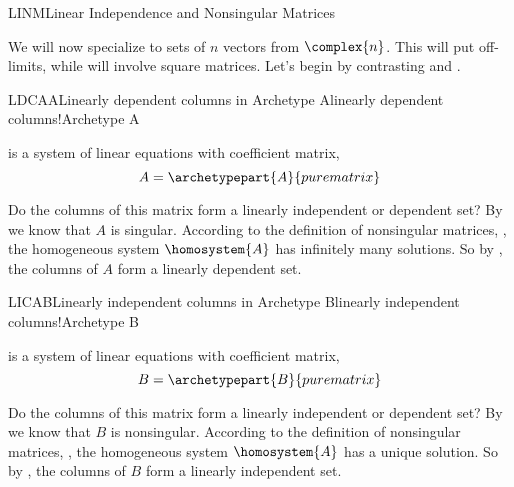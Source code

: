 \begin{subsect}{LINM}{Linear Independence and Nonsingular Matrices}
%
\begin{para}We will now specialize to sets of $n$ vectors from $\complex{n}$.  This will put  off-limits, while  will involve square matrices.  Let's begin by contrasting  and .
\end{para}
%
\begin{example}{LDCAA}{Linearly dependent columns in Archetype A}{linearly dependent columns!Archetype A}
\begin{para} is a system of linear equations with coefficient matrix,
%
\begin{equation*}
A=
\archetypepart{A}{purematrix}\end{equation*}
\end{para}
%
\begin{para}Do the columns of this matrix form a linearly independent or dependent set?  By  we know that $A$ is singular.  According to the definition of nonsingular matrices, , the homogeneous system $\homosystem{A}$ has infinitely many solutions.  So by , the columns of $A$ form a linearly dependent set.
\end{para}
%
\end{example}
%
\begin{example}{LICAB}{Linearly independent columns in Archetype B}{linearly independent columns!Archetype B}
\begin{para} is a system of linear equations with coefficient matrix,
%
\begin{equation*}
B=
\archetypepart{B}{purematrix}\end{equation*}
\end{para}
%
\begin{para}Do the columns of this matrix form a linearly independent or dependent set?  By  we know that $B$ is nonsingular.  According to the definition of nonsingular matrices, , the homogeneous system $\homosystem{A}$ has a unique solution.  So by , the columns of $B$ form a linearly independent set.\end{para}
%
\end{example}

\end{subsect}
